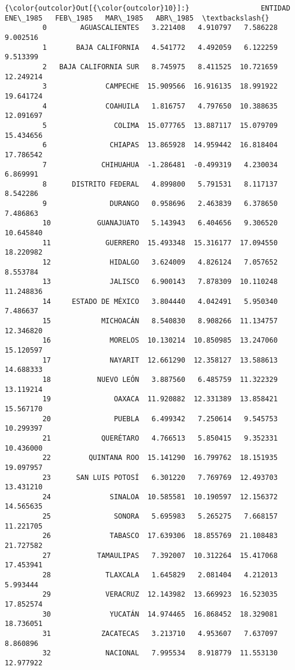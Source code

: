\documentclass[11pt]{article}
\begin{document}
\begin{Verbatim}[commandchars=\\\{\}]
{\color{outcolor}Out[{\color{outcolor}10}]:}                 ENTIDAD   ENE\_1985   FEB\_1985   MAR\_1985   ABR\_1985  \textbackslash{}
         0        AGUASCALIENTES   3.221408   4.910797   7.586228   9.002516   
         1       BAJA CALIFORNIA   4.541772   4.492059   6.122259   9.513399   
         2   BAJA CALIFORNIA SUR   8.745975   8.411525  10.721659  12.249214   
         3              CAMPECHE  15.909566  16.916135  18.991922  19.641724   
         4              COAHUILA   1.816757   4.797650  10.388635  12.091697   
         5                COLIMA  15.077765  13.887117  15.079709  15.434656   
         6               CHIAPAS  13.865928  14.959442  16.818404  17.786542   
         7             CHIHUAHUA  -1.286481  -0.499319   4.230034   6.869991   
         8      DISTRITO FEDERAL   4.899800   5.791531   8.117137   8.542286   
         9               DURANGO   0.958696   2.463839   6.378650   7.486863   
         10           GUANAJUATO   5.143943   6.404656   9.306520  10.645840   
         11             GUERRERO  15.493348  15.316177  17.094550  18.220982   
         12              HIDALGO   3.624009   4.826124   7.057652   8.553784   
         13              JALISCO   6.900143   7.878309  10.110248  11.248836   
         14     ESTADO DE MÉXICO   3.804440   4.042491   5.950340   7.486637   
         15            MICHOACÁN   8.540830   8.908266  11.134757  12.346820   
         16              MORELOS  10.130214  10.850985  13.247060  15.120597   
         17              NAYARIT  12.661290  12.358127  13.588613  14.688333   
         18           NUEVO LEÓN   3.887560   6.485759  11.322329  13.119214   
         19               OAXACA  11.920882  12.331389  13.858421  15.567170   
         20               PUEBLA   6.499342   7.250614   9.545753  10.299397   
         21            QUERÉTARO   4.766513   5.850415   9.352331  10.436000   
         22         QUINTANA ROO  15.141290  16.799762  18.151935  19.097957   
         23      SAN LUIS POTOSÍ   6.301220   7.769769  12.493703  13.431210   
         24              SINALOA  10.585581  10.190597  12.156372  14.565635   
         25               SONORA   5.695983   5.265275   7.668157  11.221705   
         26              TABASCO  17.639306  18.855769  21.108483  21.727582   
         27           TAMAULIPAS   7.392007  10.312264  15.417068  17.453941   
         28             TLAXCALA   1.645829   2.081404   4.212013   5.993444   
         29             VERACRUZ  12.143982  13.669923  16.523035  17.852574   
         30              YUCATÁN  14.974465  16.868452  18.329081  18.736051   
         31            ZACATECAS   3.213710   4.953607   7.637097   8.860896   
         32             NACIONAL   7.995534   8.918779  11.553130  12.977922   
         

\end{Verbatim}
\end{document}
